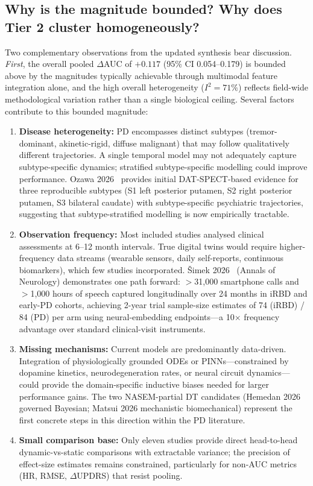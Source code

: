 \subsection{Why is the magnitude bounded? Why does Tier 2 cluster homogeneously?}
\label{sr:sec:discussion:modest}

Two complementary observations from the updated synthesis bear discussion. \emph{First}, the overall pooled $\Delta$AUC of $+0.117$ (95\% CI 0.054--0.179) is bounded above by the magnitudes typically achievable through multimodal feature integration alone, and the high overall heterogeneity ($I^2 = 71\%$) reflects field-wide methodological variation rather than a single biological ceiling. Several factors contribute to this bounded magnitude:

\begin{enumerate}
    \item \textbf{Disease heterogeneity:} PD encompasses distinct subtypes (tremor-dominant, akinetic-rigid, diffuse malignant) that may follow qualitatively different trajectories\cite{fereshtehnejad2015}. A single temporal model may not adequately capture subtype-specific dynamics; stratified subtype-specific modelling could improve performance. Ozawa 2026~\cite{ozawa2026} provides initial DAT-SPECT-based evidence for three reproducible subtypes (S1 left posterior putamen, S2 right posterior putamen, S3 bilateral caudate) with subtype-specific psychiatric trajectories, suggesting that subtype-stratified modelling is now empirically tractable.
    \item \textbf{Observation frequency:} Most included studies analysed clinical assessments at 6--12 month intervals. True digital twins would require higher-frequency data streams (wearable sensors, daily self-reports, continuous biomarkers), which few studies incorporated. \v{S}imek 2026~\cite{simek2026speech} (Annals of Neurology) demonstrates one path forward: $>$31{,}000 smartphone calls and $>$1{,}000 hours of speech captured longitudinally over 24 months in iRBD and early-PD cohorts, achieving 2-year trial sample-size estimates of 74 (iRBD) / 84 (PD) per arm using neural-embedding endpoints---a 10$\times$ frequency advantage over standard clinical-visit instruments.
    \item \textbf{Missing mechanisms:} Current models are predominantly data-driven. Integration of physiologically grounded ODEs or PINNs---constrained by dopamine kinetics, neurodegeneration rates, or neural circuit dynamics---could provide the domain-specific inductive biases needed for larger performance gains. The two NASEM-partial DT candidates (Hemedan 2026 governed Bayesian; Matsui 2026 mechanistic biomechanical) represent the first concrete steps in this direction within the PD literature.
    \item \textbf{Small comparison base:} Only eleven studies provide direct head-to-head dynamic-vs-static comparisons with extractable variance; the precision of effect-size estimates remains constrained, particularly for non-AUC metrics (HR, RMSE, $\Delta$UPDRS) that resist pooling.
\end{enumerate}

